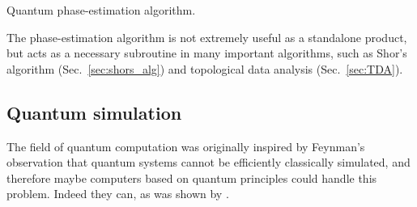\begin{table}[!htbp]
\captionspacealg \caption{Quantum phase-estimation algorithm.} \label{alg:q_phase_est}
\end{table}

The phase-estimation algorithm is not extremely useful as a standalone product, but acts as a necessary subroutine in many important algorithms, such as Shor's algorithm (Sec.~\ref{sec:shors_alg}) and topological data analysis (Sec.~\ref{sec:TDA}).

%
%

\subsection{Quantum simulation} \label{sec:quantum_sim_alg}

The field of quantum computation was originally inspired by Feynman's observation that quantum systems cannot be efficiently classically simulated, and therefore maybe computers based on quantum principles could handle this problem. Indeed they can, as was shown by \cite{bib:lloyd1996universal}.

